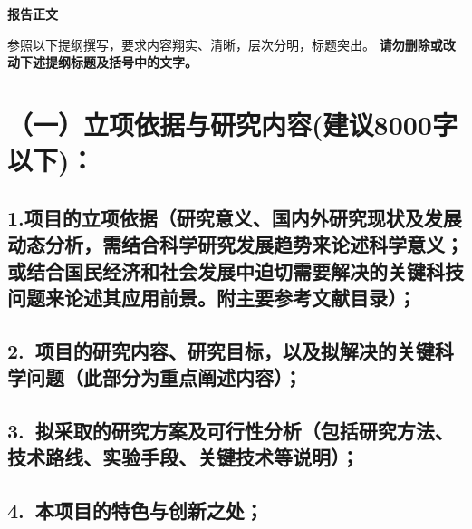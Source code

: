 \documentclass[12pt,UTF8,AutoFakeBold=3,a4paper]{ctexart} %
\newcommand{\sanhao}{\fontsize{16pt}{\baselineskip}\selectfont}
\newcommand{\sihao}{\fontsize{14pt}{\baselineskip}\selectfont}
\begin{document}

\begin{center}
{\sanhao \kaishu \bfseries 报告正文}
\end{center}

{\sihao \kaishu 参照以下提纲撰写，要求内容翔实、清晰，层次分明，标题突出。{\color{MsBlue} \bfseries 请勿删除或改动下述提纲标题及括号中的文字。}}
\vskip -5mm

\section{{\bfseries（一）立项依据与研究内容}({\bfseries 建议8000字以下})：} %

\subsection{\hspace{1.45em} 1.{\bfseries 项目的立项依据}（研究意义、国内外研究现状及发展动态分析，需结合科学研究发展趋势来论述科学意义；或结合国民经济和社会发展中迫切需要解决的关键科技问题来论述其应用前景。附主要参考文献目录）；}

{}

{}


\subsection{\hspace{1.45em} 2.~{\bfseries 项目的研究内容、研究目标，以及拟解决的关键科学问题}（此部分为重点阐述内容）；}

{}

\subsection{\hspace{1.45em} 3.~{\bfseries 拟采取的研究方案及可行性分析}（包括研究方法、技术路线、实验手段、关键技术等说明）；}

{}

\subsection{\hspace{1.45em} 4.~{\bfseries 本项目的特色与创新之处；}}
\end{document}
